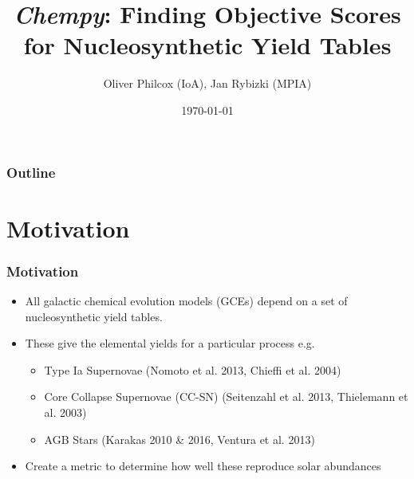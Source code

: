 \documentclass{beamer}
\begin{document}
\title[Scoring Yield Tables]{\textit{Chempy}: Finding Objective Scores for Nucleosynthetic Yield Tables}
\author[Philcox \& Rybizki]{Oliver Philcox (IoA), Jan Rybizki (MPIA)}
\date{\today}


\begin{frame}
\titlepage
\end{frame}

\begin{frame}
\frametitle{Outline}
\tableofcontents
\end{frame}

\section{Motivation}
\begin{frame}
\frametitle{Motivation}
\begin{itemize}
  \item All galactic chemical evolution models (GCEs) depend on a set of nucleosynthetic yield tables.
  \item These give the elemental yields for a particular process e.g.
  \begin{itemize}
  	\item Type Ia Supernovae (Nomoto et al. 2013, Chieffi et al. 2004) 
  	\item Core Collapse Supernovae (CC-SN) (Seitenzahl et al. 2013, Thielemann et al. 2003)
  	\item AGB Stars (Karakas 2010 \& 2016, Ventura et al. 2013)
  \end{itemize}  
  \item Create a metric to determine how well these reproduce solar abundances
\end{itemize}
\end{frame}
\end{document}
